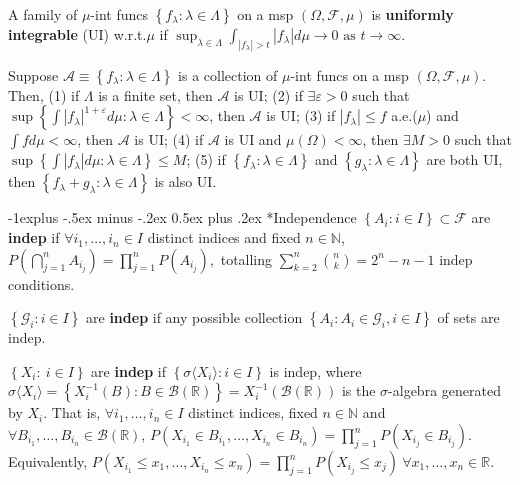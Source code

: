 \documentclass[paper=letter,fontsize=2.89mm]{scrartcl}
\makeatletter
\newcommand{\Borel}{\mathcal{B}}
\newcommand{\eps}{\varepsilon}
\newcommand{\R}{\mathbb{R}}
\newcommand{\N}{\mathbb{N}}
\newcommand\abs[1]{\left| #1 \right|}
\newcommand\set[1]{\left\{ #1 \right\}}
\renewcommand{\subsection}{\@startsection{subsection}{2}{0mm}%
                                {-1explus -.5ex minus -.2ex}%
                                {0.5ex plus .2ex}%
                                {\normalfont\normalsize\bfseries}}
\makeatother
\begin{document}
\begin{multicols*}{3}
A family of $\mu$-int funcs $\set{f_\lambda: \lambda \in \Lambda}$ on a msp $(\Omega, \mathcal{F}, \mu)$ is \textbf{uniformly integrable} (UI) w.r.t.\@ $\mu$ if 
$\sup_{\lambda \in \Lambda} \int_{\abs{f_\lambda}>t}\abs{f_\lambda}d\mu \to 0 \text{ as } t \to \infty$. \\ \medskip

Suppose $\mathcal{A} \equiv \set{f_\lambda: \lambda \in \Lambda}$ is a collection of $\mu$-int funcs on a msp $(\Omega, \mathcal{F}, \mu)$. Then,
(1) if $\Lambda$ is a finite set, then $\mathcal{A}$ is UI; (2) if $\exists \eps > 0$ such that $\sup\set{\int\abs{f_\lambda}^{1+\eps}d\mu:\lambda \in \Lambda} < \infty$, then $\mathcal{A}$ is UI; (3) if $\abs{f_\lambda} \le f$ a.e.($\mu$) and $\int f d\mu < \infty$, then $\mathcal{A}$ is UI; (4) if $\mathcal{A}$ is UI and $\mu(\Omega) < \infty$, then $\exists M > 0$ such that $\sup\set{\int\abs{f_\lambda}d\mu:\lambda \in \Lambda} \le M$; (5) if $\set{f_\lambda: \lambda \in \Lambda}$ and $\set{g_\lambda: \lambda \in \Lambda}$ are both UI, then $\set{f_\lambda + g_\lambda: \lambda \in \Lambda}$ is also UI.\\ \medskip

\subsection*{Independence}
$\set{A_i: i \in I} \subset \mathcal{F}$ are \textbf{indep} if $\forall i_1, \dots, i_n \in I$ distinct indices and fixed $n \in \N$,
$P\left(\bigcap_{j=1}^n A_{i_j}\right) = \prod_{j=1}^n P\left(A_{i_j}\right),$ totalling $\sum_{k=2}^n {n \choose k} = 2^n -n -1$ indep conditions. \\ \medskip

$\set{\mathcal{G}_i : i \in I}$ are \textbf{indep} if any possible collection $\set{A_i: A_i \in \mathcal{G}_i, i \in I}$ of sets are indep.  \\ \medskip

$\set{X_i: ~i \in I}$ are \textbf{indep} if  $\set{\sigma\langle X_i \rangle: i \in I}$ is indep, where 
$\sigma\langle X_i \rangle = \set{X_i^{-1}(B): B \in \Borel(\R)} = X_i^{-1} (\Borel(\R))$
is the $\sigma$-algebra generated by $X_i$. That is, $\forall i_1, \dots, i_n \in I$ distinct indices, fixed $n \in \N$ and $\forall B_{i_1}, \dots, B_{i_n} \in \Borel(\R)$,
$P\left(X_{i_1} \in B_{i_1}, \dots, X_{i_n} \in B_{i_n}\right) = \prod_{j=1}^n P\left(X_{i_j}\in B_{i_j}\right).$ Equivalently,
$P\left(X_{i_1} \le x_1, \dots, X_{i_n} \le x_n \right) = \prod_{j=1}^n P\left(X_{i_j}\le x_j\right) ~ \forall x_1, \dots, x_n \in \R.$ \\ \medskip


\end{multicols*}
\end{document}
